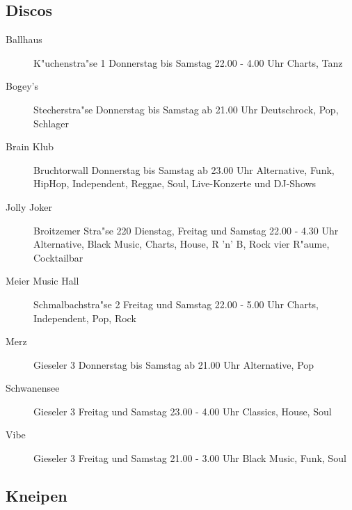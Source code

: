 \subsection{Discos}

\begin{description}
\item[Ballhaus]
K"uchenstra"se 1
Donnerstag bis Samstag 22.00 - 4.00 Uhr
Charts, Tanz

\item[Bogey's]
Stecherstra"se
Donnerstag bis Samstag ab 21.00 Uhr
Deutschrock, Pop, Schlager

\item[Brain Klub]
Bruchtorwall
Donnerstag bis Samstag ab 23.00 Uhr
Alternative, Funk, HipHop, Independent, Reggae, Soul, Live-Konzerte und DJ-Shows 

\item[Jolly Joker]
Broitzemer Stra"se 220
Dienstag, Freitag und Samstag 22.00 - 4.30 Uhr
Alternative, Black Music, Charts, House, R 'n' B, Rock
vier R"aume, Cocktailbar

\item[Meier Music Hall]
Schmalbachstra"se 2
Freitag und Samstag 22.00 - 5.00 Uhr
Charts, Independent, Pop, Rock

\item[Merz]
Gieseler 3
Donnerstag bis Samstag ab 21.00 Uhr
Alternative, Pop

\item[Schwanensee]
Gieseler 3
Freitag und Samstag 23.00 - 4.00 Uhr
Classics, House, Soul

\item[Vibe]
Gieseler 3
Freitag und Samstag 21.00 - 3.00 Uhr
Black Music, Funk, Soul

\end{description}


\subsection{Kneipen}

